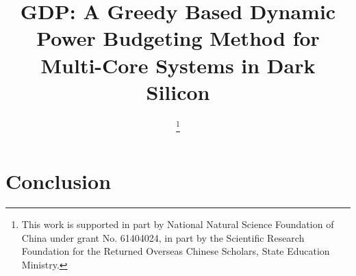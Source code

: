 \documentclass{IEEEtran}
\begin{document}
%
\title{GDP: A Greedy Based Dynamic Power Budgeting Method for Multi-Core
  Systems in Dark Silicon}



\author{

 \thanks{
This work is supported in part by National Natural Science Foundation of China under grant No. 61404024, in part by the Scientific Research Foundation for the Returned Overseas Chinese Scholars, State Education Ministry.
}
}

\maketitle

\begin{abstract}

\end{abstract}
\maketitle









\section{Conclusion}\label{sec:conclusion}



\end{document}
